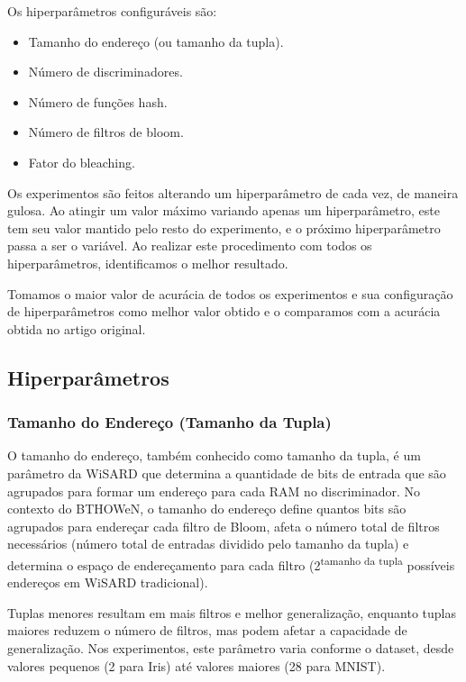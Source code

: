 \documentclass{article}
\begin{document}
Os hiperparâmetros configuráveis são:

\begin{itemize}
    \item Tamanho do endereço (ou tamanho da tupla).
    \item Número de discriminadores.
    \item Número de funções hash.
    \item Número de filtros de bloom.
    \item Fator do bleaching.
\end{itemize}

Os experimentos são feitos alterando um hiperparâmetro de cada vez, de maneira gulosa. Ao atingir um valor máximo variando apenas um hiperparâmetro, este tem seu valor mantido pelo resto do experimento, e o próximo hiperparâmetro passa a ser o variável. Ao realizar este procedimento com todos os hiperparâmetros, identificamos o melhor resultado.

Tomamos o maior valor de acurácia de todos os experimentos e sua configuração de hiperparâmetros como melhor valor obtido e o comparamos com a acurácia obtida no artigo original.

\subsection{Hiperparâmetros}

\subsubsection{Tamanho do Endereço (Tamanho da Tupla)}

O tamanho do endereço, também conhecido como tamanho da tupla, é um parâmetro da WiSARD que determina a quantidade de bits de entrada que são agrupados para formar um endereço para cada RAM no discriminador. 
No contexto do BTHOWeN, o tamanho do endereço define quantos bits são agrupados para endereçar cada filtro de Bloom, afeta o número total de filtros necessários (número total de entradas dividido pelo tamanho da tupla) e determina o espaço de endereçamento para cada filtro (2\textsuperscript{tamanho da tupla} possíveis endereços em WiSARD tradicional).

Tuplas menores resultam em mais filtros e melhor generalização, enquanto tuplas maiores reduzem o número de filtros, mas podem afetar a capacidade de generalização. Nos experimentos, este parâmetro varia conforme o dataset, desde valores pequenos (2 para Iris) até valores maiores (28 para MNIST).
\end{document}
